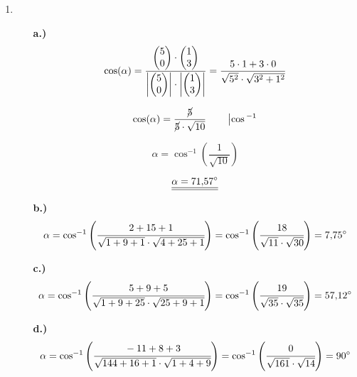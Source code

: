 \begin{enumerate}
	
		\item
			\begin{enumerate}
				\item[\textbf{a.)}]	$$ \cos(\alpha)=\dfrac{\begin{pmatrix} 5 \\ 0 \end{pmatrix} \cdot \begin{pmatrix} 1 \\ 3 \end{pmatrix}} {\left|\begin{pmatrix} 5 \\ 0 \end{pmatrix}\right| \cdot \left| \begin{pmatrix} 1 \\ 3 \end{pmatrix}\right|}=\dfrac{5\cdot1+3\cdot0} {\sqrt{5^2} \cdot \sqrt{3^2+1^2}} $$
								
				$$ \cos(\alpha)=\dfrac{\cancel{5}}{\cancel{5}\cdot\sqrt{10}} \qquad \left|\cos{}^{-1}\right.$$ 
								
				$$\alpha=\cos^{-1}\left(\dfrac{1}{\sqrt{10}}\right)$$
				
				$$\underline{\underline{\alpha = 71\mathrm{,}57^\circ}}$$
\medskip
				\item[\textbf{b.)}]			
				$$\alpha=\cos^{-1}\left(\cfrac{2+15+1}{\sqrt{1+9+1}\cdot\sqrt{4+25+1}}\right)=\cos^{-1}\left(\cfrac{18}{\sqrt{11}\cdot\sqrt{30}}\right)=7\mathrm{,}75^\circ$$
				\item[\textbf{c.)}]	$$\alpha=\cos^{-1}\left(\cfrac{5+9+5}{\sqrt{1+9+25}\cdot\sqrt{25+9+1}}\right)=\cos^{-1}\left(\cfrac{19}{\sqrt{35}\cdot\sqrt{35}}\right)=57\mathrm{,}12^\circ$$
				\item[\textbf{d.)}]	$$\alpha=\cos^{-1}\left(\cfrac{-11+8+3}{\sqrt{144+16+1}\cdot\sqrt{1+4+9}}\right)=\cos^{-1}\left(\cfrac{0}{\sqrt{161}\cdot\sqrt{14}}\right)=90^\circ$$	
		\end{enumerate}
		\hfill\newline
		\end{enumerate}
